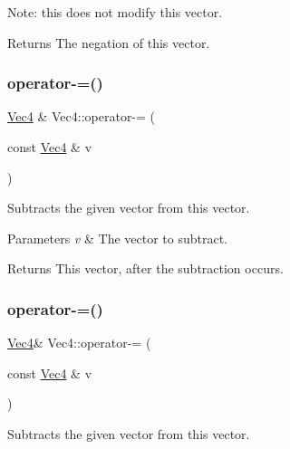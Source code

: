 Note\+: this does not modify this vector.

\begin{DoxyReturn}{Returns}
The negation of this vector. 
\end{DoxyReturn}
\mbox{\label{classVec4_a5d61d144300c6f8edcea3292bf15bfde}} 
\subsubsection{\texorpdfstring{operator-\/=()}{operator-=()}\hspace{0.1cm}{\footnotesize\ttfamily [1/2]}}
{\footnotesize\ttfamily \hyperlink{classVec4}{Vec4} \& Vec4\+::operator-\/= (\begin{DoxyParamCaption}\item[{const \hyperlink{classVec4}{Vec4} \&}]{v }\end{DoxyParamCaption})\hspace{0.3cm}{\ttfamily [inline]}}

Subtracts the given vector from this vector.


\begin{DoxyParams}{Parameters}
{\em v} & The vector to subtract. \\
\hline
\end{DoxyParams}
\begin{DoxyReturn}{Returns}
This vector, after the subtraction occurs. 
\end{DoxyReturn}
\mbox{\label{classVec4_a2644a968dd429cece5ed615aa3615db6}} 
\subsubsection{\texorpdfstring{operator-\/=()}{operator-=()}\hspace{0.1cm}{\footnotesize\ttfamily [2/2]}}
{\footnotesize\ttfamily \hyperlink{classVec4}{Vec4}\& Vec4\+::operator-\/= (\begin{DoxyParamCaption}\item[{const \hyperlink{classVec4}{Vec4} \&}]{v }\end{DoxyParamCaption})\hspace{0.3cm}{\ttfamily [inline]}}

Subtracts the given vector from this vector.


